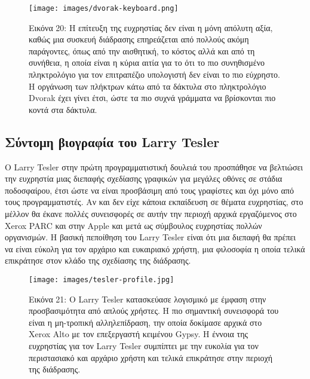 \documentclass[
]{article}
\begin{document}
\leavevmode{}%
\begin{figure}
\hypertarget{fig:dvorak-keyboard}{%
\centering
\texttt{[image: images/dvorak-keyboard.png]}
\caption{Εικόνα 20: Η επίτευξη της ευχρηστίας δεν είναι η μόνη απόλυτη
αξία, καθώς μια συσκευή διάδρασης επηρεάζεται από πολλούς ακόμη
παράγοντες, όπως από την αισθητική, το κόστος αλλά και από τη συνήθεια,
η οποία είναι η κύρια αιτία για το ότι το πιο συνηθισμένο πληκτρολόγιο
για τον επιτραπέζιο υπολογιστή δεν είναι το πιο εύχρηστο. Η οργάνωση των
πλήκτρων κάτω από τα δάκτυλα στο πληκτρολόγιο Dvorak έχει γίνει έτσι,
ώστε τα πιο συχνά γράμματα να βρίσκονται πιο κοντά στα
δάκτυλα.}\label{fig:dvorak-keyboard}
}
\end{figure}

\hypertarget{ux3c3ux3cdux3bdux3c4ux3bfux3bcux3b7-ux3b2ux3b9ux3bfux3b3ux3c1ux3b1ux3c6ux3afux3b1-ux3c4ux3bfux3c5-larry-tesler}{%
\subsection{Σύντομη βιογραφία του Larry
Tesler}\label{ux3c3ux3cdux3bdux3c4ux3bfux3bcux3b7-ux3b2ux3b9ux3bfux3b3ux3c1ux3b1ux3c6ux3afux3b1-ux3c4ux3bfux3c5-larry-tesler}}

Ο Larry Tesler στην πρώτη προγραμματιστική δουλειά του προσπάθησε να
βελτιώσει την ευχρηστία μιας διεπαφής σχεδίασης γραφικών για μεγάλες
οθόνες σε στάδια ποδοσφαίρου, έτσι ώστε να είναι προσβάσιμη από τους
γραφίστες και όχι μόνο από τους προγραμματιστές. Αν και δεν είχε κάποια
εκπαίδευση σε θέματα ευχρηστίας, στο μέλλον θα έκανε πολλές συνεισφορές
σε αυτήν την περιοχή αρχικά εργαζόμενος στο Xerox PARC και στην Apple
και μετά ως σύμβουλος ευχρηστίας πολλών οργανισμών. Η βασική πεποίθηση
του Larry Tesler είναι ότι μια διεπαφή θα πρέπει να είναι εύκολη για τον
αρχάριο και ευκαιριακό χρήστη, μια φιλοσοφία η οποία τελικά επικράτησε
στον κλάδο της σχεδίασης της διάδρασης.

\leavevmode{}%
\begin{figure}
\hypertarget{fig:tesler-profile}{%
\centering
\texttt{[image: images/tesler-profile.jpg]}
\caption{Εικόνα 21: Ο Larry Tesler κατασκεύασε λογισμικό με έμφαση στην
προσβασιμότητα από απλούς χρήστες. Η πιο σημαντική συνεισφορά του είναι
η μη-τροπική αλληλεπίδραση, την οποία δοκίμασε αρχικά στο Xerox Alto με
τον επεξεργαστή κειμένου Gypsy. Η έννοια της ευχρηστίας για τον Larry
Tesler συμπίπτει με την ευκολία για τον περιστασιακό και αρχάριο χρήστη
και τελικά επικράτησε στην περιοχή της
διάδρασης.}\label{fig:tesler-profile}
}
\end{figure}
\end{document}
